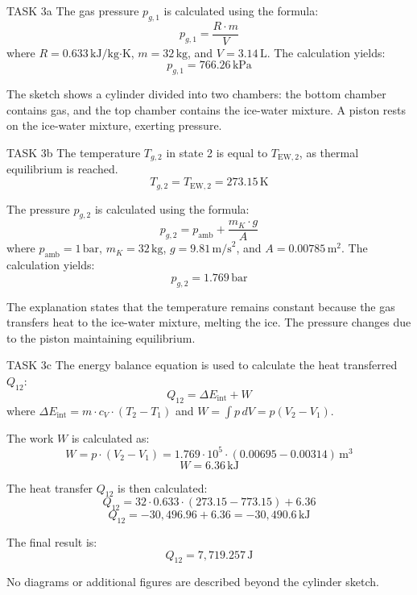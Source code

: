 TASK 3a  
The gas pressure \( p_{g,1} \) is calculated using the formula:  
\[
p_{g,1} = \frac{R \cdot m}{V}
\]  
where \( R = 0.633 \, \text{kJ/kg·K} \), \( m = 32 \, \text{kg} \), and \( V = 3.14 \, \text{L} \).  
The calculation yields:  
\[
p_{g,1} = 766.26 \, \text{kPa}
\]  

The sketch shows a cylinder divided into two chambers: the bottom chamber contains gas, and the top chamber contains the ice-water mixture. A piston rests on the ice-water mixture, exerting pressure.  

TASK 3b  
The temperature \( T_{g,2} \) in state 2 is equal to \( T_{\text{EW},2} \), as thermal equilibrium is reached.  
\[
T_{g,2} = T_{\text{EW},2} = 273.15 \, \text{K}
\]  

The pressure \( p_{g,2} \) is calculated using the formula:  
\[
p_{g,2} = p_{\text{amb}} + \frac{m_K \cdot g}{A}
\]  
where \( p_{\text{amb}} = 1 \, \text{bar} \), \( m_K = 32 \, \text{kg} \), \( g = 9.81 \, \text{m/s}^2 \), and \( A = 0.00785 \, \text{m}^2 \).  
The calculation yields:  
\[
p_{g,2} = 1.769 \, \text{bar}
\]  

The explanation states that the temperature remains constant because the gas transfers heat to the ice-water mixture, melting the ice. The pressure changes due to the piston maintaining equilibrium.  

TASK 3c  
The energy balance equation is used to calculate the heat transferred \( Q_{12} \):  
\[
Q_{12} = \Delta E_{\text{int}} + W
\]  
where \( \Delta E_{\text{int}} = m \cdot c_V \cdot (T_2 - T_1) \) and \( W = \int p \, dV = p(V_2 - V_1) \).  

The work \( W \) is calculated as:  
\[
W = p \cdot (V_2 - V_1) = 1.769 \cdot 10^5 \cdot (0.00695 - 0.00314) \, \text{m}^3
\]  
\[
W = 6.36 \, \text{kJ}
\]  

The heat transfer \( Q_{12} \) is then calculated:  
\[
Q_{12} = 32 \cdot 0.633 \cdot (273.15 - 773.15) + 6.36
\]  
\[
Q_{12} = -30,496.96 + 6.36 = -30,490.6 \, \text{kJ}
\]  

The final result is:  
\[
Q_{12} = 7,719.257 \, \text{J}
\]  

No diagrams or additional figures are described beyond the cylinder sketch.